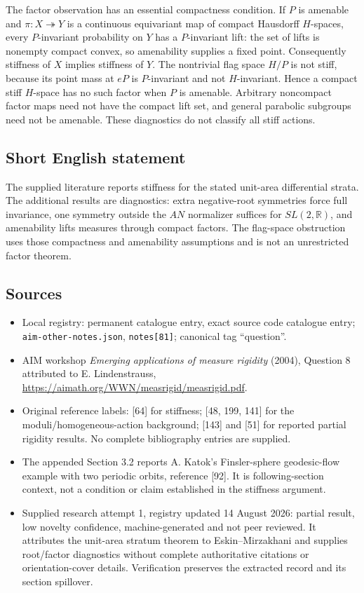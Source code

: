\documentclass[11pt]{article}
\newcommand{\R}{\mathbb{R}}
\begin{document}
The factor observation has an essential compactness condition. If $P$ is amenable and $\pi:X\twoheadrightarrow Y$ is a continuous equivariant map of compact Hausdorff $H$-spaces, every $P$-invariant probability on $Y$ has a $P$-invariant lift: the set of lifts is nonempty compact convex, so amenability supplies a fixed point. Consequently stiffness of $X$ implies stiffness of $Y$. The nontrivial flag space $H/P$ is not stiff, because its point mass at $eP$ is $P$-invariant and not $H$-invariant. Hence a compact stiff $H$-space has no such factor when $P$ is amenable. Arbitrary noncompact factor maps need not have the compact lift set, and general parabolic subgroups need not be amenable. These diagnostics do not classify all stiff actions.
\subsection{Short English statement}
The supplied literature reports stiffness for the stated unit-area differential strata. The additional results are diagnostics: extra negative-root symmetries force full invariance, one symmetry outside the $AN$ normalizer suffices for $SL(2,\R)$, and amenability lifts measures through compact factors. The flag-space obstruction uses those compactness and amenability assumptions and is not an unrestricted factor theorem.
\subsection{Sources}
\begin{itemize}
\item Local registry: permanent catalogue entry, exact source code catalogue entry; \texttt{aim-other-notes.json}, \texttt{notes[81]}; canonical tag ``question''.
\item AIM workshop \emph{Emerging applications of measure rigidity} (2004), Question 8 attributed to E. Lindenstrauss, \url{https://aimath.org/WWN/measrigid/measrigid.pdf}.
\item Original reference labels: [64] for stiffness; [48, 199, 141] for the moduli/homogeneous-action background; [143] and [51] for reported partial rigidity results. No complete bibliography entries are supplied.
\item The appended Section 3.2 reports A. Katok's Finsler-sphere geodesic-flow example with two periodic orbits, reference [92]. It is following-section context, not a condition or claim established in the stiffness argument.
\item Supplied research attempt 1, registry updated 14 August 2026: partial result, low novelty confidence, machine-generated and not peer reviewed. It attributes the unit-area stratum theorem to Eskin--Mirzakhani and supplies root/factor diagnostics without complete authoritative citations or orientation-cover details. Verification preserves the extracted record and its section spillover.
\end{itemize}
\end{document}
